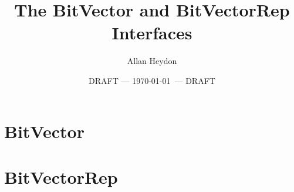 \documentclass{article}
\begin{document}
\title{The BitVector and BitVectorRep Interfaces}
\author{Allan Heydon}
\date{DRAFT --- \today\ --- DRAFT}
\maketitle

\section{BitVector}


\section{BitVectorRep}

\end{document}
